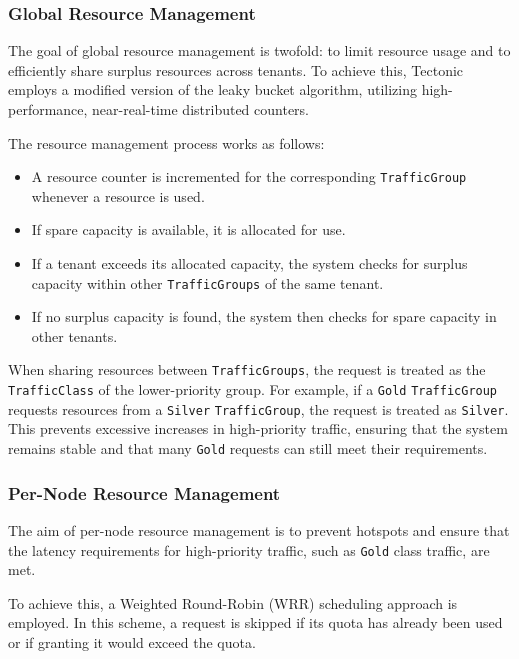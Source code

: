 \subsubsection{Global Resource Management}\label{sec:global_resource_management}

The goal of global resource management is twofold: to limit resource usage and to efficiently share surplus resources across tenants. To achieve this, Tectonic employs a modified version of the leaky bucket algorithm, utilizing high-performance, near-real-time distributed counters.

The resource management process works as follows:

\begin{itemize}\label{list:resource_management}
    \item A resource counter is incremented for the corresponding \texttt{TrafficGroup} whenever a resource is used.
    \item If spare capacity is available, it is allocated for use.
    \item If a tenant exceeds its allocated capacity, the system checks for surplus capacity within other \texttt{TrafficGroups} of the same tenant.
    \item If no surplus capacity is found, the system then checks for spare capacity in other tenants.
\end{itemize}

When sharing resources between \texttt{TrafficGroups}, the request is treated as the \texttt{TrafficClass} of the lower-priority group. For example, if a \texttt{Gold} \texttt{TrafficGroup} requests resources from a \texttt{Silver} \texttt{TrafficGroup}, the request is treated as \texttt{Silver}. This prevents excessive increases in high-priority traffic, ensuring that the system remains stable and that many \texttt{Gold} requests can still meet their requirements.

\subsubsection{Per-Node Resource Management}\label{sec:per_node_resource_management}

The aim of per-node resource management is to prevent hotspots and ensure that the latency requirements for high-priority traffic, such as \texttt{Gold} class traffic, are met.

To achieve this, a Weighted Round-Robin (WRR) scheduling approach is employed. In this scheme, a request is skipped if its quota has already been used or if granting it would exceed the quota.

